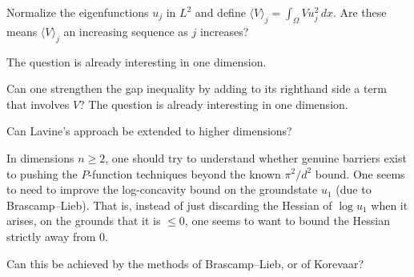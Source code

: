 \documentclass[12pt,letterpaper, reqno]{amsart}
\begin{document}
\begin{problemblock}
\begin{problem}[3.2] 
Normalize the eigenfunctions
$u_j$ in $L^2$ and define $\langle V \rangle_j = \int_\Omega V u_j^2
\, dx$. Are these means  $\langle V \rangle_j$ an increasing
sequence as $j$ increases?
\end{problem}
\begin{distinguishedremark}
 The question is already interesting in
one dimension.
\end{distinguishedremark}

\end{problemblock}



\begin{problemblock}
\begin{problem}[3.25] 
Can one strengthen the gap
inequality by adding to its righthand side a term that involves $V$?
The question is already interesting in one dimension.
\end{problem}
\end{problemblock}

\begin{problemblock}
\begin{problem}[3.3] 
Can Lavine's approach be
extended to higher dimensions?
\end{problem}
\end{problemblock}

\begin{problemblock}

In dimensions $n \geq 2$, one
should try to understand whether genuine barriers exist to pushing
the $P$-function techniques beyond the known $\pi^2/d^2$ bound. One
seems to need to improve the log-concavity bound on the groundstate
$u_1$ (due to Brascamp--Lieb). That is, instead of just discarding
the Hessian of $\log u_1$ when it arises, on the grounds that it is
$\leq 0$, one seems to want to bound the Hessian strictly away from
$0$.

\begin{problem}[3.35] 
 Can this be achieved by the methods of Brascamp--Lieb, or of
Korevaar?
\end{problem}
\end{problemblock}
\end{document}
